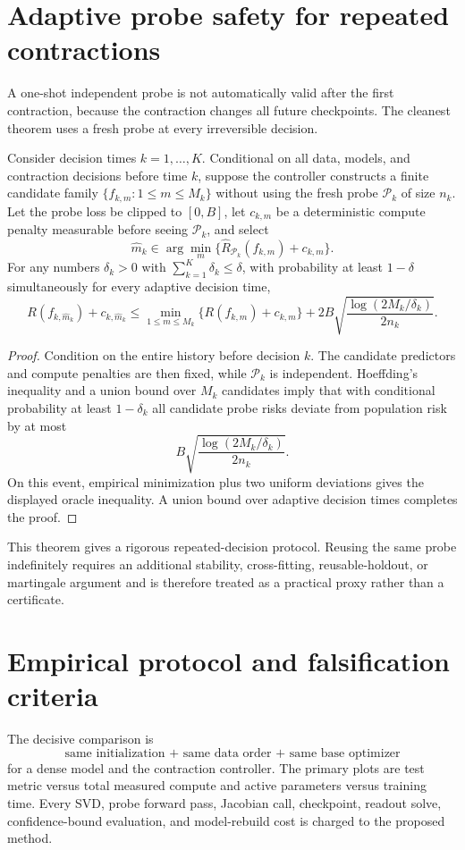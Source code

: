 \section{Adaptive probe safety for repeated contractions}
A one-shot independent probe is not automatically valid after the first contraction, because the contraction changes all future checkpoints. The cleanest theorem uses a fresh probe at every irreversible decision.

\begin{theorem}\label{thm:fresh-probe}
Consider decision times $k=1,\ldots,K$. Conditional on all data, models, and contraction decisions before time $k$, suppose the controller constructs a finite candidate family $\{f_{k,m}:1\le m\le M_k\}$ without using the fresh probe $\mathcal P_k$ of size $n_k$. Let the probe loss be clipped to $[0,B]$, let $c_{k,m}$ be a deterministic compute penalty measurable before seeing $\mathcal P_k$, and select
\[
\widehat m_k\in\arg\min_m\{\widehat R_{\mathcal P_k}(f_{k,m})+c_{k,m}\}.
\]
For any numbers $\delta_k>0$ with $\sum_{k=1}^K\delta_k\le\delta$, with probability at least $1-\delta$ simultaneously for every adaptive decision time,
\[
\boxed{
R(f_{k,\widehat m_k})+c_{k,\widehat m_k}
\le
\min_{1\le m\le M_k}\{R(f_{k,m})+c_{k,m}\}
+2B\sqrt{\frac{\log(2M_k/\delta_k)}{2n_k}}.}
\]
\end{theorem}

\begin{proof}
Condition on the entire history before decision $k$. The candidate predictors and compute penalties are then fixed, while $\mathcal P_k$ is independent. Hoeffding's inequality and a union bound over $M_k$ candidates imply that with conditional probability at least $1-\delta_k$ all candidate probe risks deviate from population risk by at most
\[
B\sqrt{\frac{\log(2M_k/\delta_k)}{2n_k}}.
\]
On this event, empirical minimization plus two uniform deviations gives the displayed oracle inequality. A union bound over adaptive decision times completes the proof.
\end{proof}

This theorem gives a rigorous repeated-decision protocol. Reusing the same probe indefinitely requires an additional stability, cross-fitting, reusable-holdout, or martingale argument and is therefore treated as a practical proxy rather than a certificate.

\section{Empirical protocol and falsification criteria}
The decisive comparison is
\[
\text{same initialization + same data order + same base optimizer}
\]
for a dense model and the contraction controller. The primary plots are test metric versus total measured compute and active parameters versus training time. Every SVD, probe forward pass, Jacobian call, checkpoint, readout solve, confidence-bound evaluation, and model-rebuild cost is charged to the proposed method.

